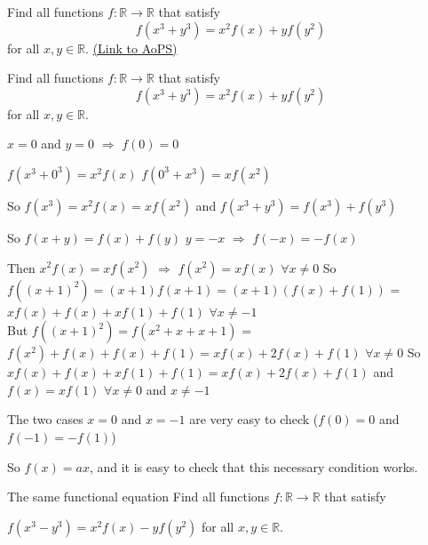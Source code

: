 \begin{problem}
	Find all functions $ f : \mathbb{R}\to\mathbb{R}$ that satisfy
\[ f (x^{3} + y^{3}) = x^{2}f (x) + yf (y^{2})
\]
for all $ x, y \in\mathbb R.$
	\flushright \href{https://artofproblemsolving.com/community/c6h150112}{(Link to AoPS)}
\end{problem}



\begin{mysolution}
	\begin{tcolorbox}Find all functions $f : \mathbb{R}\to\mathbb{R}$ that satisfy
\[f (x^{3}+y^{3}) = x^{2}f (x)+yf (y^{2}) \]
for all $x, y \in\mathbb R.$\end{tcolorbox}

$x=0$ and $y=0$ $\Rightarrow $ $f(0)=0$

$f (x^{3}+0^{3}) = x^{2}f (x)$
$f (0^{3}+x^{3}) = xf (x^{2})$

So $f(x^{3})=x^{2}f (x)=xf (x^{2})$ and $f (x^{3}+y^{3}) = f (x^{3})+f (y^{3})$

So $f(x+y)=f(x)+f(y)$ 
$y=-x$ $\Rightarrow $ $f(-x)=-f(x)$

Then $x^{2}f (x)=xf (x^{2})$ $\Rightarrow $ $f(x^{2})=xf(x)$ $\forall x\neq 0$
So $f((x+1)^{2})=(x+1)f(x+1)=(x+1)(f(x)+f(1))$ = $xf(x)+f(x)+xf(1)+f(1)$ $\forall x\neq-1$ \\
But $f((x+1)^{2})=f(x^{2}+x+x+1)$ = $f(x^{2})+f(x)+f(x)+f(1)=xf(x)+2f(x)+f(1)$ $\forall x\neq 0$
So $xf(x)+f(x)+xf(1)+f(1) =xf(x)+2f(x)+f(1)$  and $f(x)=xf(1)$ $\forall x\neq0$ and $x\neq-1$

The two cases $x=0$ and $x=-1$ are very easy to check ($f(0)=0$ and $f(-1)=-f(1)$)

So $f(x)=ax$, and it is easy to check that this necessary condition works.
\end{mysolution}





\begin{mysolution}
	The same functional equation
Find all functions $ f :\mathbb{R}\to\mathbb{R}$ that satisfy

$ f (x^{3}-y^{3}) = x^{2}f (x)-yf (y^{2})$
for all $ x, y\in\mathbb R.$ 
\end{mysolution}



